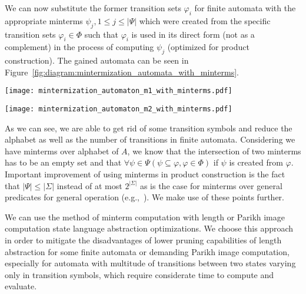 We can now substitute the former transition sets $\varphi_i$ for finite automata with the appropriate minterms $\psi_j, 1 \leq j \leq |\Psi|$ which were created from the specific transition sets $\varphi_i \in \Phi$ such that $\varphi_i$ is used in its direct form (not as a complement) in the process of computing $\psi_j$ (optimized for product construction). The gained automata can be seen in Figure~\ref{fig:diagram:mintermization_automata_with_minterms}.

\begin{figure*}[ht]
    \centering
    \begin{minipage}{0.47\linewidth}
        \centering
        \texttt{[image: mintermization\_automaton\_m1\_with\_minterms.pdf]}
        \caption{Finite automaton $A_1$ with transitions substituted by corresponding minterms $\psi_i \in \Psi$ created from these transition sets.}
        \label{fig:diagram:mintermization_automaton_m1_with_minterms}
    \end{minipage}
    \hfill
    \begin{minipage}{0.47\linewidth}
        \centering
        \texttt{[image: mintermization\_automaton\_m2\_with\_minterms.pdf]}
        \caption{Finite automaton $A_2$ with transitions substituted by corresponding minterms $\psi_i \in \Psi$ created from these transition sets.}
        \label{fig:diagram:mintermization_automaton_m2_with_minterms}
    \end{minipage}
    \vspace{0.5cm}
    \caption{Finite automata $A_1$ and $A_2$ with substituted transitions with minterms in the process of mintermization.}
    \label{fig:diagram:mintermization_automata_with_minterms}
\end{figure*}

As we can see, we are able to get rid of some transition symbols and reduce the alphabet as well as the number of transitions in finite automata. Considering we have minterms over alphabet of $A$, we know that the intersection of two minterms has to be an empty set and that $\forall \psi \in \Psi ( \psi \subseteq \varphi, \varphi \in \Phi )$ if $\psi$ is created from $\varphi$. Important improvement of using minterms in product construction is the fact that $|\Psi| \leq |\Sigma|$ instead of at most $2^{|\Sigma|}$ as is the case for minterms over general predicates for general operation (e.g.,~\cite{minterms_forms-FITPUB11801}). We make use of these points further.

We can use the method of minterm computation with length or Parikh image computation state language abstraction optimizations. We choose this approach in order to mitigate the disadvantages of lower pruning capabilities of length abstraction for some finite automata or demanding Parikh image computation, especially for automata with multitude of transitions between two states varying only in transition symbols, which require considerate time to compute and evaluate.

